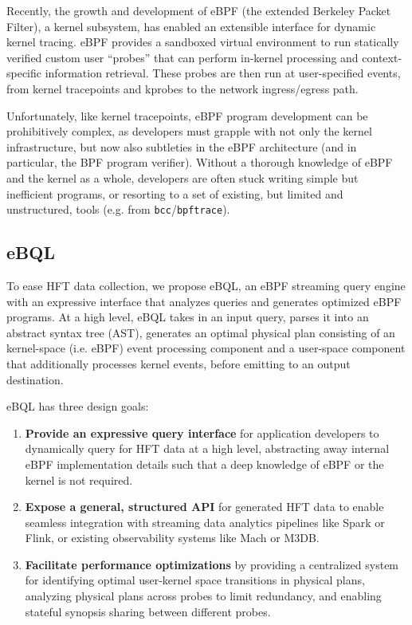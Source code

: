 Recently, the growth and development of eBPF (the extended Berkeley Packet Filter), a kernel
subsystem, has enabled an extensible interface for dynamic kernel tracing. eBPF provides a sandboxed
virtual environment to run statically verified custom user ``probes'' that can perform in-kernel
processing and context-specific information retrieval. These probes are then run at user-specified
events, from kernel tracepoints and kprobes to the network ingress/egress path.

Unfortunately, like kernel tracepoints, eBPF program development can be prohibitively complex, as
developers must grapple with not only the kernel infrastructure, but now also subtleties in the eBPF
architecture (and in particular, the BPF program verifier). Without a thorough knowledge of eBPF and
the kernel as a whole, developers are often stuck writing simple but inefficient programs, or
resorting to a set of existing, but limited and unstructured, tools (e.g. from
\texttt{bcc}/\texttt{bpftrace}).

\subsection{eBQL}

To ease HFT data collection, we propose eBQL, an eBPF streaming query engine with an expressive
interface that analyzes queries and generates optimized eBPF programs. At a high level, eBQL takes
in an input query, parses it into an abstract syntax tree (AST), generates an optimal physical plan
consisting of an kernel-space (i.e. eBPF) event processing component and a user-space component that
additionally processes kernel events, before emitting to an output destination.

eBQL has three design goals:
\begin{enumerate}
        \item \textbf{Provide an expressive query interface} for application developers to
            dynamically query for HFT data at a high level, abstracting away internal eBPF
            implementation details such that a deep knowledge of eBPF or the kernel is not required.
        \item \textbf{Expose a general, structured API} for generated HFT data to enable seamless
            integration with streaming data analytics pipelines like Spark or Flink, or existing
            observability systems like Mach or M3DB.
        \item \textbf{Facilitate performance optimizations} by providing a centralized system for
            identifying optimal user-kernel space transitions in physical plans, analyzing physical
            plans across probes to limit redundancy, and enabling stateful synopsis sharing between
            different probes.
\end{enumerate}

